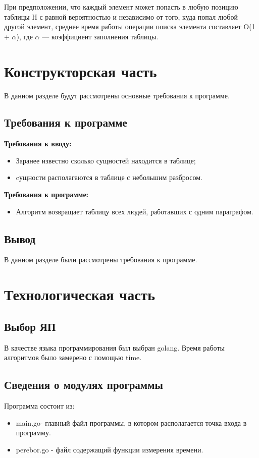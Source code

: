 \documentclass[12pt]{report}
\begin{document}
При предположении, что каждый элемент может попасть в любую позицию таблицы H с равной вероятностью и независимо от того, куда попал любой другой элемент, среднее время работы операции поиска элемента составляет O(1 + $\alpha$), где $\alpha$ — коэффициент заполнения таблицы.

\chapter{Конструкторская часть}
В данном разделе будут рассмотрены основные требования к программе.

\section{Требования к программе}
\textbf{Требования к вводу:}
\begin{itemize}
	\item Заранее известно сколько сущностей находится в таблице;
	\item cущности располагаются в таблице с небольшим разбросом.
\end{itemize}

\textbf{Требования к программе:}
\begin{itemize}
	\item Алгоритм возвращает таблицу всех людей, работавших с одним параграфом.
\end{itemize}


\section*{Вывод}
В данном разделе были рассмотрены требования к программе.


\chapter{Технологическая часть}

\section{Выбор ЯП}
В качестве языка программирования был выбран golang.
Время работы алгоритмов было замерено с помощью time. 
\section{Сведения о модулях программы}
Программа состоит из:
\begin{itemize}
	\item main.go- главный файл программы, в котором располагается точка входа в программу.
	\item perebor.go - файл содержащий функции измерения времени.
\end{itemize}
\end{document}
